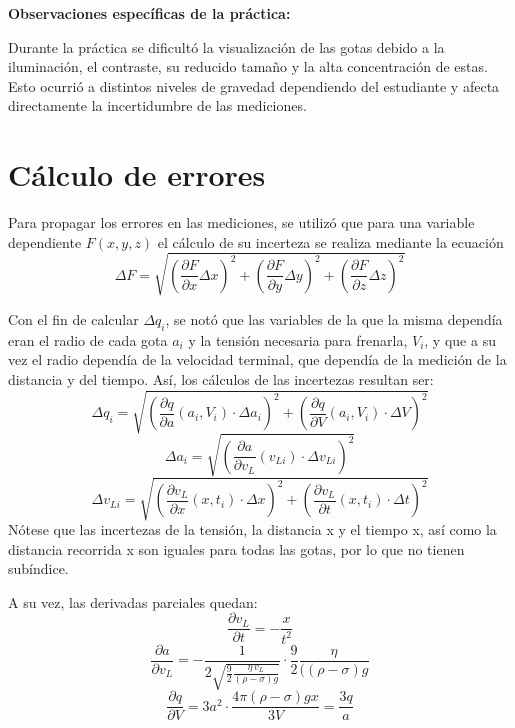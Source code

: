 \documentclass{article}
\begin{document}
\textbf{Observaciones específicas de la práctica:} 

Durante la práctica se dificultó la visualización de las gotas debido a la iluminación, el contraste, su reducido
 tamaño y la alta concentración de estas. Esto ocurrió a distintos niveles de gravedad dependiendo del 
estudiante y afecta directamente la incertidumbre de las mediciones.

\section{Cálculo de errores}
Para propagar los errores en las mediciones, se utilizó que para una variable dependiente $F(x,y,z)$ el cálculo de su incerteza se realiza mediante la ecuación
\[
\Delta F =
\sqrt{
\left(\frac{\partial F}{\partial x}\Delta x\right)^2
+
\left(\frac{\partial F}{\partial y}\Delta y\right)^2
+
\left(\frac{\partial F}{\partial z}\Delta z\right)^2
}
\]

Con el fin de calcular $\Delta q_i$, se notó que las variables de la que la misma dependía eran el radio de cada gota $a_i$ y la tensión necesaria para frenarla, $V_i$, y que a su vez el radio dependía de la velocidad terminal, que dependía de la medición de la distancia y del tiempo. Así, los cálculos de las incertezas resultan ser:
\[
\Delta q_i =
\sqrt{
\left(\frac{\partial q}{\partial a}(a_i,V_i)\cdot \Delta a_i\right)^2
+
\left(\frac{\partial q}{\partial V}(a_i,V_i )\cdot\Delta V\right)^2
}
\]
\[
\Delta a_i = \sqrt{\left(\frac{\partial a}{\partial v_L}(v_{Li})\cdot\Delta v_{Li}\right)^2 }
\]
\[
\Delta v_{Li} = \sqrt{\left(\frac{\partial v_L}{\partial x}(x,t_i)\cdot\Delta x\right)^2
+
\left(\frac{\partial v_L}{\partial t}(x,t_i)\cdot\Delta t\right)^2}
\]
Nótese que las incertezas de la tensión, la distancia x y el tiempo x, así como la distancia recorrida x son iguales para todas las gotas, por lo que no tienen subíndice.

A su vez, las derivadas parciales quedan:
\begin{equation*}
    \frac{\partial v_L}{\partial t} = -\frac{x}{t^2}
\end{equation*}
\begin{equation*}
    \frac{\partial a}{\partial v_L} = -\frac{1}{2\sqrt{\frac{9}{2}\frac{\eta \, v_L}{(\rho-\sigma)g}}} \cdot\frac{9}{2} \frac{\eta}{((\rho-\sigma)g} 
\end{equation*}
\begin{equation*}
    \frac{\partial q}{\partial V} = 3a^2\cdot \frac{4\pi (\rho-\sigma)gx}{3V}=\frac{3q}{a}
\end{equation*}
\end{document}
